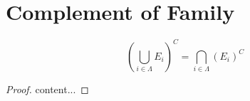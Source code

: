 \documentclass[11pt,openany]{article}
\begin{document}
\section{Complement of Family}
\begin{note}
	\[
	\left(\bigcup_{i\in\Lambda}E_i\right)^C=
	\bigcap_{i\in\Lambda}\left(E_i\right)^C
	\]
	\begin{proof}
		content...
	\end{proof}
\end{note}
\end{document}
